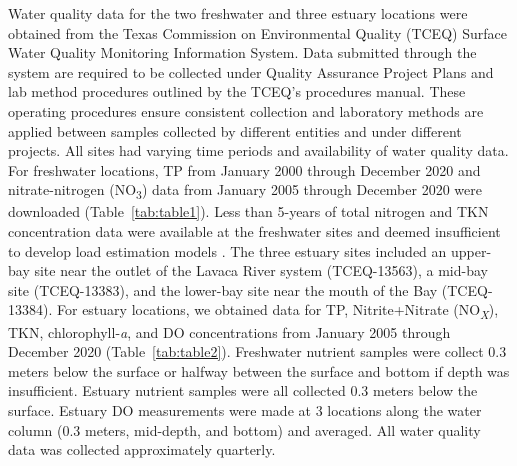 \documentclass[fleqn,10pt,lineno]{wlpeerj} %
\begin{document}
Water quality data for the two freshwater and three estuary locations
were obtained from the Texas Commission on Environmental Quality (TCEQ)
Surface Water Quality Monitoring Information System. Data submitted
through the system are required to be collected under Quality Assurance
Project Plans and lab method procedures outlined by the TCEQ's
procedures manual. These operating procedures ensure consistent
collection and laboratory methods are applied between samples collected
by different entities and under different projects. All sites had
varying time periods and availability of water quality data. For
freshwater locations, TP from January 2000 through December 2020 and
nitrate-nitrogen (NO\textsubscript{3}) data from January 2005 through
December 2020 were downloaded (Table~\ref{tab:table1}). Less than
5-years of total nitrogen and TKN concentration data were available at
the freshwater sites and deemed insufficient to develop load estimation
models
\autocite{horowitzEvaluationSedimentRating2003,snelderEstimationCatchmentNutrient2017}.
The three estuary sites included an upper-bay site near the outlet of
the Lavaca River system (TCEQ-13563), a mid-bay site (TCEQ-13383), and
the lower-bay site near the mouth of the Bay (TCEQ-13384). For estuary
locations, we obtained data for TP, Nitrite+Nitrate
(NO\textsubscript{\emph{X}}), TKN, chlorophyll-\emph{a}, and DO
concentrations from January 2005 through December 2020
(Table~\ref{tab:table2}). Freshwater nutrient samples were collect 0.3
meters below the surface or halfway between the surface and bottom if
depth was insufficient. Estuary nutrient samples were all collected 0.3
meters below the surface. Estuary DO measurements were made at 3
locations along the water column (0.3 meters, mid-depth, and bottom) and
averaged. All water quality data was collected approximately quarterly.
\end{document}
